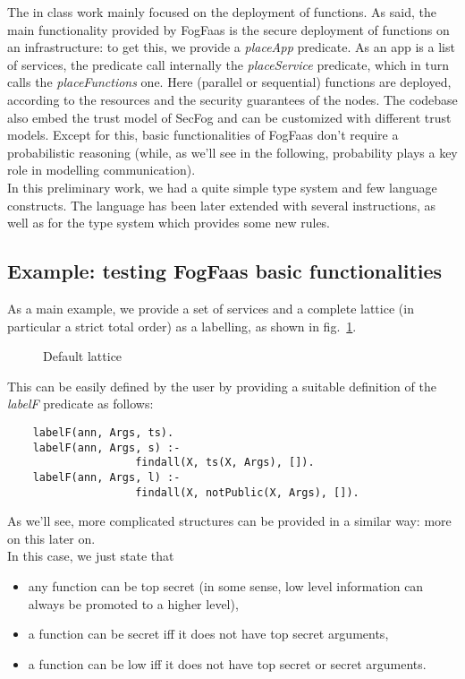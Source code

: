 \documentclass[../DraftNotes.tex]{subfiles}
\begin{document}
The in class work mainly focused on the deployment of functions. As said, the main functionality provided by FogFaas is the secure deployment of functions on an infrastructure: to get this, we provide a \emph{placeApp} predicate. As an app is a list of services, the predicate call internally the \emph{placeService} predicate, which in turn calls the \emph{placeFunctions} one. Here (parallel or sequential) functions are deployed, according to the resources and the security guarantees of the nodes.
The codebase also embed the trust model of SecFog and can be customized with different trust models. Except for this, basic functionalities of FogFaas don't require a probabilistic reasoning (while, as we'll see in the following, probability plays a key role in modelling communication). \\
In this preliminary work, we had a quite simple type system and few language constructs. The language has been later extended with several instructions, as well as for the type system which provides some new rules.

\subsection{Example: testing FogFaas basic functionalities}
As a main example, we provide a set of services and a complete lattice (in particular a strict total order) as a labelling, as shown in fig.~\ref{fig:tot_order}.

\begin{figure}[h!]
	\begin{center}
	\caption{Default lattice}
  	\label{fig:tot_order}
  	\end{center}
\end{figure}

This can be easily defined by the user by providing a suitable definition of the \emph{labelF} predicate as follows:

\begin{verbatim}
	labelF(ann, Args, ts).
	labelF(ann, Args, s) :- 
                    findall(X, ts(X, Args), []).
	labelF(ann, Args, l) :- 
                    findall(X, notPublic(X, Args), []).
\end{verbatim}

As we'll see, more complicated structures can be provided in a similar way: more on this later on. \\
In this case, we just state that
\begin{itemize}
	\item any function can be top secret (in some sense, low level information can always be promoted to a higher level),
	\item a function can be secret iff it does not have top secret arguments,
	\item a function can be low iff it does not have top secret or secret arguments.
\end{itemize}
\end{document}
